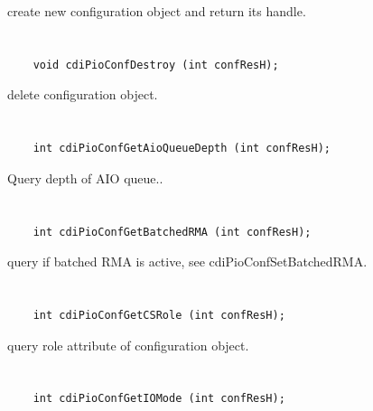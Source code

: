 create new configuration object and return its handle.


\section*{\tt {}}

\begin{verbatim}
    void cdiPioConfDestroy (int confResH);
\end{verbatim}

delete configuration object.


\section*{\tt {}}

\begin{verbatim}
    int cdiPioConfGetAioQueueDepth (int confResH);
\end{verbatim}

Query depth of AIO queue..


\section*{\tt {}}

\begin{verbatim}
    int cdiPioConfGetBatchedRMA (int confResH);
\end{verbatim}

query if batched RMA is active, see
cdiPioConfSetBatchedRMA.


\section*{\tt {}}

\begin{verbatim}
    int cdiPioConfGetCSRole (int confResH);
\end{verbatim}

query role attribute of configuration object.


\section*{\tt {}}

\begin{verbatim}
    int cdiPioConfGetIOMode (int confResH);
\end{verbatim}

